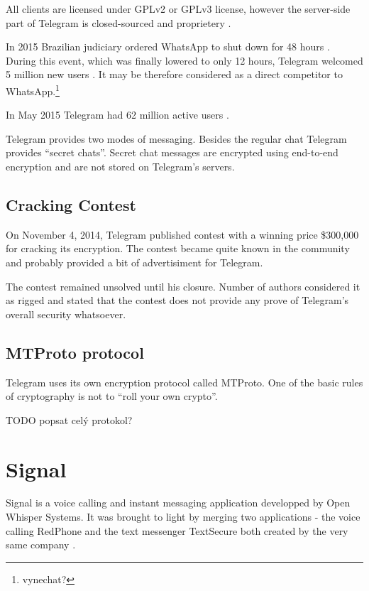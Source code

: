 \documentclass[thesis=M,english]{FITthesis}[2012/10/20]
\begin{document}
All clients are licensed under GPLv2 or GPLv3 license, however the server-side part of Telegram is closed-sourced and proprietery \cite{telegram-server}.

In 2015 Brazilian judiciary ordered WhatsApp to shut down for 48 hours \cite{whatsappbrazil}. During this event, which was finally lowered to only 12 hours, Telegram welcomed 5 million new users \cite{whatsappbrazil}. It may be therefore considered as a direct competitor to WhatsApp.\footnote{vynechat?}

In May 2015 Telegram had 62 million active users \cite{telegram-users}.

Telegram provides two modes of messaging. Besides the regular chat Telegram provides ``secret chats''. Secret chat messages are encrypted using end-to-end encryption and are not stored on Telegram's servers\cite{telegramfaq}.

\subsection{Cracking Contest}

On November 4, 2014, Telegram published contest with a winning price \$300,000 for cracking its encryption. The contest became quite known in the community and probably provided a bit of advertisiment for Telegram.

The contest remained unsolved until his closure. Number of authors considered it as rigged and stated that the contest does not provide any prove of Telegram's overall security whatsoever.\cite{telegramcontestfail}\cite{telegramcontestfail2}

\subsection{MTProto protocol}

Telegram uses its own encryption protocol called MTProto. One of the basic rules of cryptography is not to ``roll your own crypto''.

TODO popsat celý protokol?


\section{Signal}

Signal is a voice calling and instant messaging application developped by Open Whisper Systems. It was brought to light by merging two applications - the voice calling RedPhone and the text messenger TextSecure both created by the very same company \cite{signalmerge}.
\end{document}
